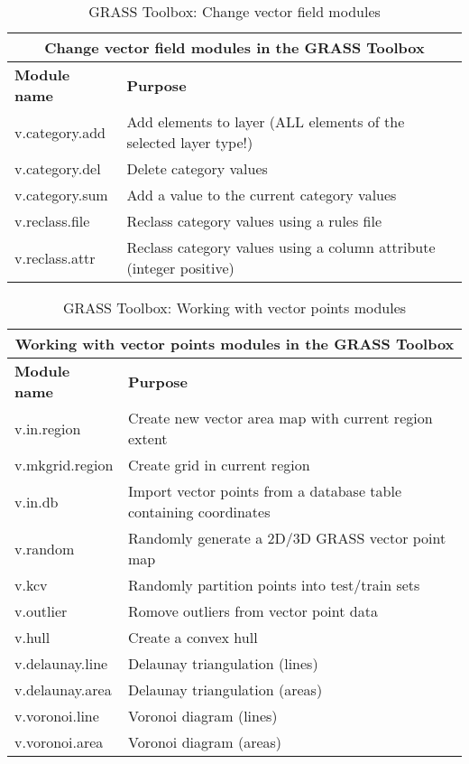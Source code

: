 \begin{table}[ht]
\centering
\caption{GRASS Toolbox: Change vector field modules}\medskip
 \begin{tabular}{|p{4cm}|p{12cm}|}
  \hline \multicolumn{2}{|c|}{\textbf{Change vector field modules in the GRASS
  Toolbox}} \\
  \hline \textbf{Module name} & \textbf{Purpose} \\
  \hline v.category.add & Add elements to layer (ALL elements of the selected
  layer type!)\\
  \hline v.category.del & Delete category values \\
  \hline v.category.sum & Add a value to the current category values \\
  \hline v.reclass.file & Reclass category values using a rules file \\
  \hline v.reclass.attr & Reclass category values using a column attribute
  (integer positive) \\
\hline
\end{tabular}
\end{table}

\begin{table}[ht]
\centering
\caption{GRASS Toolbox: Working with vector points modules}\medskip
 \begin{tabular}{|p{4cm}|p{12cm}|}
  \hline \multicolumn{2}{|c|}{\textbf{Working with vector points modules in the GRASS Toolbox}} \\
  \hline \textbf{Module name} & \textbf{Purpose} \\
  \hline v.in.region & Create new vector area map with current region extent \\
  \hline v.mkgrid.region & Create grid in current region \\
  \hline v.in.db & Import vector points from a database table containing
  coordinates \\
  \hline v.random & Randomly generate a 2D/3D GRASS vector point map \\
  \hline v.kcv & Randomly partition points into test/train sets \\
  \hline v.outlier & Romove outliers from vector point data \\
  \hline v.hull & Create a convex hull \\
  \hline v.delaunay.line & Delaunay triangulation (lines) \\
  \hline v.delaunay.area & Delaunay triangulation (areas) \\
  \hline v.voronoi.line & Voronoi diagram (lines) \\
  \hline v.voronoi.area & Voronoi diagram (areas) \\
\hline
\end{tabular}
\end{table}

